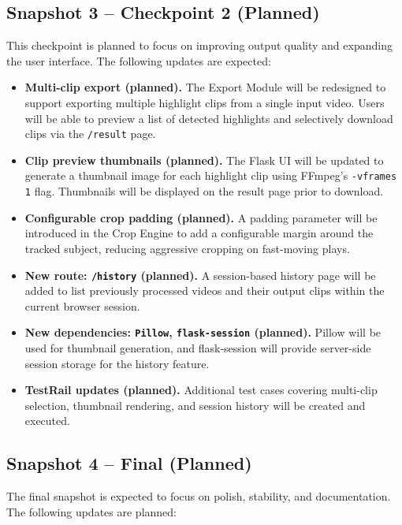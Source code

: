\documentclass[12pt]{article}
\begin{document}
\subsection{Snapshot 3 -- Checkpoint 2 (Planned)}
This checkpoint is planned to focus on improving output quality and expanding
the user interface. The following updates are expected:

\begin{itemize}[noitemsep]
    \item \textbf{Multi-clip export (planned).} The Export Module will be redesigned
          to support exporting multiple highlight clips from a single input video.
          Users will be able to preview a list of detected highlights and selectively
          download clips via the \texttt{/result} page.
    \item \textbf{Clip preview thumbnails (planned).} The Flask UI will be updated
          to generate a thumbnail image for each highlight clip using FFmpeg's
          \texttt{-vframes 1} flag. Thumbnails will be displayed on the result page
          prior to download.
    \item \textbf{Configurable crop padding (planned).} A padding parameter will
          be introduced in the Crop Engine to add a configurable margin around the
          tracked subject, reducing aggressive cropping on fast-moving plays.
    \item \textbf{New route: \texttt{/history} (planned).} A session-based history
          page will be added to list previously processed videos and their output
          clips within the current browser session.
    \item \textbf{New dependencies: \texttt{Pillow}, \texttt{flask-session} (planned).}
          Pillow will be used for thumbnail generation, and flask-session will
          provide server-side session storage for the history feature.
    \item \textbf{TestRail updates (planned).} Additional test cases covering
          multi-clip selection, thumbnail rendering, and session history will be
          created and executed.
\end{itemize}

\subsection{Snapshot 4 -- Final (Planned)}
The final snapshot is expected to focus on polish, stability, and documentation.
The following updates are planned:
\end{document}
